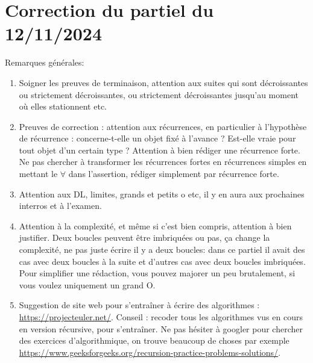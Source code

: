 \documentclass[11pt,a4paper]{article}
\title{}
\date{}
\begin{document}
\pagestyle{fancy}

\fancyhead{}
 \fancyfoot{}


\newcommand{\lb}{\llbracket}
\newcommand{\rb}{\rrbracket}
\newcommand{\N}{\mathbb{N}}
\newcommand{\Z}{\mathbb{Z}}
\newcommand{\R}{\mathbb{R}}




\newcommand{\md}[3]{#1\ \equiv \ #2 \! \! \! \! \! \pmod {#3} }
\newcommand{\nmd}[3]{#1 \not \equiv #2 \! \! \! \! \!  \pmod {#3} }
\newcommand{\mda}[3]{#1 \equiv #2 \! \!  \pmod {#3} }
\newcommand{\nmda}[3]{#1 \not \equiv #2 \! \! \pmod {#3} }
\newcommand{\mo}[2]{#1 \! \! \! \! \! \pmod #2 }
\newcommand{\moa}[2]{#1 \! \!  \pmod {#2} }

\thispagestyle{fancy}

\section*{Correction du partiel du 12/11/2024}


Remarques générales:
\begin{enumerate}
\item Soigner les preuves de terminaison, attention aux suites qui sont décroissantes ou strictement décroissantes, ou strictement décroissantes jusqu'au moment où elles stationnent etc.
\item Preuves de correction : attention aux récurrences, en particulier à l'hypothèse de récurrence : concerne-t-elle un objet fixé à l'avance ? Est-elle vraie pour tout objet d'un certain type ? Attention à bien rédiger une récurrence forte. Ne pas chercher à transformer les récurrences fortes en récurrences simples en mettant le $\forall$ dans l'assertion, rédiger simplement par récurrence forte.
\item Attention aux DL, limites, grands et petits o etc, il y en aura aux prochaines interros et à l'examen.
\item Attention à la complexité, et même si c'est bien compris, attention à bien justifier. Deux boucles peuvent être imbriquées ou pas, ça change la complexité, ne pas juste écrire \og il y a deux boucles\fg : dans ce partiel il avait des cas avec deux boucles à la suite et d'autres cas avec deux boucles imbriquées. Pour simplifier une rédaction, vous pouvez majorer un peu brutalement, si vous voulez uniquement un grand O.
\item  Suggestion de site web pour s'entraîner à écrire des algorithmes  : \url{https://projecteuler.net/}. Conseil : recoder tous les algorithmes vus en cours en version récursive, pour s'entraîner. Ne pas hésiter à googler pour chercher des exercices d'algorithmique, on trouve beaucoup de choses par exemple \url{https://www.geeksforgeeks.org/recursion-practice-problems-solutions/}.
\end{enumerate}
\end{document}
